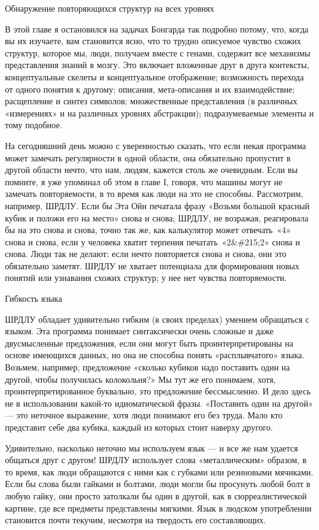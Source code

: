 \documentclass[../main.tex]{subfiles}
\begin{document}
Обнаружение повторяющихся структур на всех уровнях

В этой главе я остановился на задачах Бонгарда так подробно потому, что, когда вы их изучаете, вам становится ясно, что то трудно описуемое чувство схожих структур, которое мы, люди, получаем вместе с генами, содержит все механизмы представления знаний в мозгу. Это включает вложенные друг в друга контексты, концептуальные скелеты и концептуальное отображение; возможность перехода от одного понятия к другому; описания, мета-описания и их взаимодействие; расщепление и синтез символов; множественные представления (в различных «измерениях» и на различных уровнях абстракции); подразумеваемые элементы и тому подобное.

На сегодняшний день можно с уверенностью сказать, что если некая программа может замечать регулярности в одной области, она обязательно пропустит в другой области нечто, что нам, людям, кажется столь же очевидным. Если вы помните, я уже упоминал об этом в главе I, говоря, что машины могут не замечать повторяемости, в то время как люди на это не способны. Рассмотрим, например, ШРДЛУ. Если бы Эта Ойн печатала фразу «Возьми большой красный кубик и положи его на место» снова и снова; ШРДЛУ, не возражая, реагировала бы на это снова и снова, точно так же, как калькулятор может отвечать~«4» снова и снова, если у человека хватит терпения печатать~«2\&\#215;2» снова и снова. Люди так не делают: если нечто повторяется снова и снова, они это обязательно заметят. ШРДЛУ не хватает потенциала для формирования новых понятий или узнавания схожих структур; у нее нет чувства повторяемости.

Гибкость языка

ШРДЛУ обладает удивительно гибким (в своих пределах) умением обращаться с языком. Эта программа понимает синтаксически очень сложные и даже двусмысленные предложения, если они могут быть проинтерпретированы на основе имеющихся данных, но она не способна понять «расплывчатого» языка. Возьмем, например, предложение «сколько кубиков надо поставить один на другой, чтобы получилась колокольня?» Мы тут же его понимаем, хотя, проинтерпретированное буквально, это предложение бессмысленно. И дело здесь не в использовании какой-то идиоматической фразы. «Поставить один на другой» --- это неточное выражение, хотя люди понимают его без труда. Мало кто представит себе два кубика, каждый из которых стоит наверху другого.

Удивительно, насколько неточно мы используем язык --- и все же нам удается общаться друг с другом! ШРДЛУ использует слова «металлическим» образом, в то время, как люди обращаются с ними как с губками или резиновыми мячиками. Если бы слова были гайками и болтами, люди могли бы просунуть любой болт в любую гайку, они просто затолкали бы один в другой, как в сюрреалистической картине, где все предметы представлены мягкими. Язык в людском употреблении становится почти текучим, несмотря на твердость его составляющих.
\end{document}
